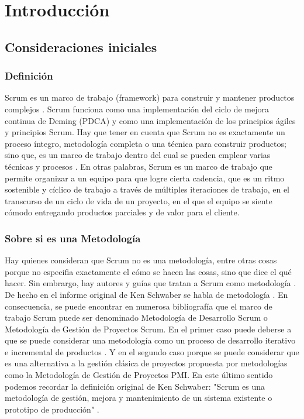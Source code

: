 \chapter{Introducción}

\section{Consideraciones iniciales}

\subsection{Definición}

Scrum es un marco de trabajo (framework) para construir y mantener productos complejos \cite{SBOK-2013} \cite{Scrum-Alliance-2015}. 
Scrum funciona como una implementación del ciclo de mejora continua de Deming (PDCA) y como una implementación de los principios ágiles y principios Scrum. Hay que tener en cuenta que Scrum no es exactamente un proceso íntegro, metodología completa o una técnica para construir productos; sino que, es un marco de trabajo dentro del cual se pueden emplear varias técnicas y procesos \cite{Agile-Atlas-2012}. En otras palabras, Scrum es un marco de trabajo que permite organizar a un equipo para que logre cierta cadencia, que es un ritmo sostenible y cíclico de trabajo a través de múltiples iteraciones de trabajo, en el transcurso de un ciclo de vida de un proyecto, en el que el equipo se siente cómodo entregando productos parciales y de valor para el cliente.

\subsection{Sobre si es una Metodología}

Hay quienes consideran que Scrum no es una metodología, entre otras cosas porque no especifia exactamente el cómo se hacen las cosas, 
sino que dice el qué hacer. Sin embrargo, hay autores y guías que tratan a Scrum como metodología \cite{SBOK-2013}. De hecho en el informe original de Ken Schwaber se habla de metodología \cite{Ken-Schwaber-1995}. En consecuencia, se puede encontrar en numerosa bibliografía que el marco de trabajo Scrum puede ser denominado Metodología de Desarrollo Scrum o Metodología de Gestión de Proyectos Scrum. 
En el primer caso puede deberse a que se puede considerar una metodología como un proceso de desarrollo iterativo e incremental de productos \cite{Ken-Schwaber-1995}. Y en el segundo caso porque se puede considerar que es una alternativa a la gestión clásica de proyectos propuesta por metodologías como la Metodología de Gestión de Proyectos PMI. En este último sentido podemos recordar la definición original de Ken Schwaber: "Scrum es una metodología de gestión, mejora y mantenimiento de un sistema existente o prototipo de producción" \cite{Ken-Schwaber-1995}.
 
